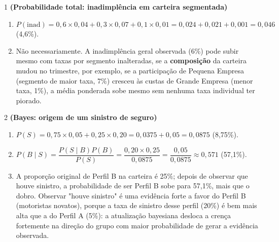 \documentclass[11pt]{article}
\begin{document}

\begin{questao}{1} \textbf{(Probabilidade total: inadimplência em carteira segmentada)}
\begin{solucao}
\begin{enumerate}[label=(\alph*)]
  \item $P(\text{inad}) = 0{,}6\times 0{,}04 + 0{,}3\times 0{,}07 + 0{,}1\times 0{,}01
    = 0{,}024+0{,}021+0{,}001 = 0{,}046$ (4,6\%).
  \item Não necessariamente. A inadimplência geral observada (6\%) pode subir mesmo com taxas
    por segmento inalteradas, se a \textbf{composição} da carteira mudou no trimestre, por
    exemplo, se a participação de Pequena Empresa (segmento de maior taxa, 7\%) cresceu às custas
    de Grande Empresa (menor taxa, 1\%), a média ponderada sobe mesmo sem nenhuma taxa individual
    ter piorado.
\end{enumerate}
\end{solucao}
\end{questao}

\begin{questao}{2} \textbf{(Bayes: origem de um sinistro de seguro)}
\begin{solucao}
\begin{enumerate}[label=(\alph*)]
  \item $P(S) = 0{,}75\times 0{,}05 + 0{,}25\times 0{,}20 = 0{,}0375+0{,}05 = 0{,}0875$ (8,75\%).
  \item $P(B\mid S) = \dfrac{P(S\mid B)P(B)}{P(S)} = \dfrac{0{,}20\times 0{,}25}{0{,}0875} =
    \dfrac{0{,}05}{0{,}0875} \approx 0{,}571$ (57,1\%).
  \item A proporção original de Perfil B na carteira é 25\%; depois de observar que houve
    sinistro, a probabilidade de ser Perfil B sobe para 57,1\%, mais que o dobro. Observar
    "houve sinistro" é uma evidência forte a favor do Perfil B (motoristas novatos), porque a taxa
    de sinistro desse perfil (20\%) é bem mais alta que a do Perfil A (5\%): a atualização
    bayesiana desloca a crença fortemente na direção do grupo com maior probabilidade de gerar a
    evidência observada.
\end{enumerate}
\end{solucao}
\end{questao}
\end{document}
